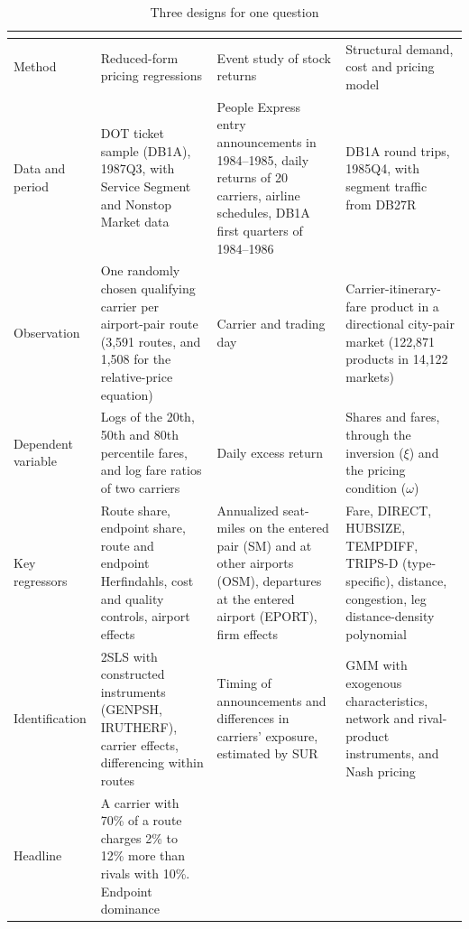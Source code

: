 \begin{table}[htbp]
\centering
\begin{threeparttable}
\caption{Three designs for one question}
\label{tab:09-compare}
\footnotesize
\begin{tabularx}{\textwidth}{@{}>{\raggedright\arraybackslash}p{1.9cm}>{\raggedright\arraybackslash}X
  >{\raggedright\arraybackslash}X>{\raggedright\arraybackslash}X@{}}
\toprule
 & \citet{Borenstein1989} & \citet{WhinstonCollins1992} & \citet{BerryCarnallSpiller2006} \\
\midrule
Method & Reduced-form pricing regressions & Event study of stock returns & Structural demand, cost and
  pricing model \\
\addlinespace
Data and period & DOT ticket sample (DB1A), 1987Q3, with Service Segment and Nonstop Market data & 24 People
  Express entry announcements in 1984--1985, daily returns of 20 carriers, airline schedules, DB1A first
  quarters of 1984--1986 & DB1A round trips, 1985Q4, with segment traffic from DB27R \\
\addlinespace
Observation & One randomly chosen qualifying carrier per airport-pair route (3,591 routes, and 1,508 for the
  relative-price equation) & Carrier and trading day & Carrier-itinerary-fare product in a directional
  city-pair market (122,871 products in 14,122 markets) \\
\addlinespace
Dependent variable & Logs of the 20th, 50th and 80th percentile fares, and log fare ratios of two carriers &
  Daily excess return & Shares and fares, through the inversion ($\xi$) and the pricing condition
  ($\omega$) \\
\addlinespace
Key regressors & Route share, endpoint share, route and endpoint Herfindahls, cost and quality controls,
  airport effects & Annualized seat-miles on the entered pair (SM) and at other airports (OSM), departures
  at the entered airport (EPORT), firm effects & Fare, DIRECT, HUBSIZE, TEMPDIFF, TRIPS-D (type-specific),
  distance, congestion, leg distance-density polynomial \\
\addlinespace
Identification & 2SLS with constructed instruments (GENPSH, IRUTHERF), carrier effects, differencing
  within routes & Timing of announcements and differences in carriers' exposure, estimated by SUR & GMM with
  exogenous characteristics, network and rival-product instruments, and Nash pricing \\
\addlinespace
Headline & A carrier with 70\% of a route charges 2\% to 12\% more than rivals with 10\%. Endpoint dominance

\end{tabularx}
\end{threeparttable}
\end{table}
